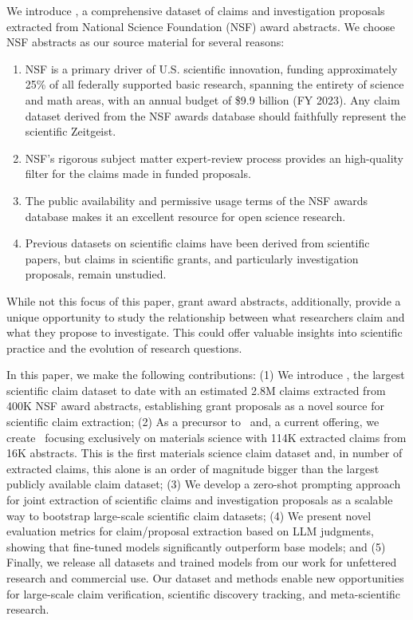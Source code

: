 \documentclass[11pt]{article}
\begin{document}
We introduce \DatasetName, a comprehensive dataset of claims and investigation proposals extracted from National Science Foundation (NSF) award abstracts. We choose NSF abstracts as our source material for several reasons:

\begin{enumerate}[noitemsep,topsep=0pt]
\item NSF is a primary driver of U.S. scientific innovation, funding approximately 25\% of all federally supported basic research, spanning the entirety of science and math areas, with an annual budget of \$9.9 billion (FY 2023). Any claim dataset derived from the NSF awards database should faithfully represent the scientific Zeitgeist. 
\item NSF's rigorous subject matter expert-review process provides an high-quality filter for the claims made in funded proposals.
\item The public availability and permissive usage terms of the NSF awards database makes it an excellent resource for open science research.
\item Previous datasets on scientific claims have been derived from scientific papers, but claims in scientific grants, and particularly investigation proposals, remain unstudied.
\end{enumerate}

While not this focus of this paper, grant award abstracts, additionally, provide a unique opportunity to study the relationship between what researchers claim and what they propose to investigate. This could offer valuable insights into scientific practice and the evolution of research questions.

In this paper, we make the following contributions: (1) We introduce \DatasetName, the largest scientific claim dataset to date with an estimated 2.8M claims extracted from 400K NSF award abstracts, establishing grant proposals as a novel source for scientific claim extraction; (2) As a precursor to \DatasetName~and, a current offering, we create \DatasetNameMatSci~focusing exclusively on materials science with 114K extracted claims from 16K abstracts. This is the first materials science claim dataset and, in number of extracted claims, this alone is an order of magnitude bigger than the largest publicly available claim dataset; (3) We develop a zero-shot prompting approach for joint extraction of scientific claims and investigation proposals as a scalable way to bootstrap large-scale scientific claim datasets; (4) We present novel evaluation metrics for claim/proposal extraction based on LLM judgments, showing that fine-tuned models significantly outperform base models; and (5) Finally, we release all datasets and trained models from our work for unfettered research and commercial use. Our dataset and methods enable new opportunities for large-scale claim verification, scientific discovery tracking, and meta-scientific research.
\end{document}
